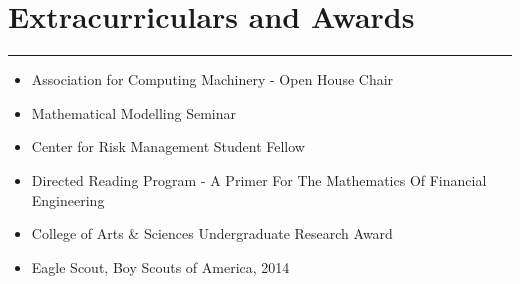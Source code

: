 \documentclass[11pt]{article}
\newcommand{\resumesection}[1]{\vspace{-0.2cm}\section*{#1}\vspace{-0.2cm}\hrule\vspace{0.2cm}}
\begin{document}
\resumesection{Extracurriculars and Awards}
\begin{itemize}
	\item Association for Computing Machinery - Open House Chair 
	\item Mathematical Modelling Seminar
	\item Center for Risk Management Student Fellow
	\item Directed Reading Program - A Primer For The Mathematics Of Financial Engineering
	\item College of Arts \& Sciences Undergraduate Research Award
	\item Eagle Scout, Boy Scouts of America, 2014
\end{itemize}


\end{document}
